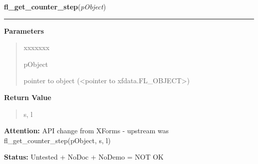 \hspace{.8\funcindent}\begin{boxedminipage}{\funcwidth}

    \raggedright \textbf{fl\_get\_counter\_step}(\textit{pObject})

    \vspace{-1.5ex}

    \rule{\textwidth}{0.5\fboxrule}
\setlength{\parskip}{2ex}
\setlength{\parskip}{1ex}
      \textbf{Parameters}
      \vspace{-1ex}

      \begin{quote}
        \begin{Ventry}{xxxxxxx}

          \item[pObject]

          pointer to object ({\textless}pointer to 
          xfdata.FL\_OBJECT{\textgreater})

        \end{Ventry}

      \end{quote}

      \textbf{Return Value}
    \vspace{-1ex}

      \begin{quote}
      s, l

      \end{quote}

\textbf{Attention:} API change from XForms - upstream was fl\_get\_counter\_step(pObject, s, l)



\textbf{Status:} Untested + NoDoc + NoDemo = NOT OK



    \end{boxedminipage}

    \label{xformslib:library:fl_set_counter_filter}

    \vspace{0.5ex}

